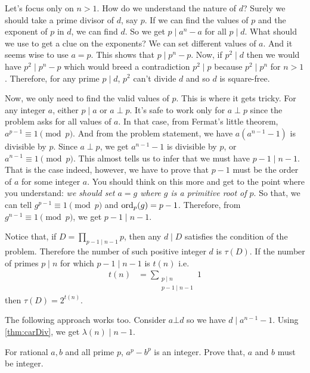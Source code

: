 \begin{solution}
	Let's focus only on $n>1$. How do we understand the nature of $d$? Surely we should take a prime divisor of $d$, say $p$. If we can find the values of $p$ and the exponent of $p$ in $d$, we can find $d$. So we get $p\mid a^n-a$ for all $p\mid d$. What should we use to get a clue on the exponents? We can set different values of $a$. And it seems wise to use $a=p$. This shows that $p\mid p^n-p$. Now, if $p^2\mid d$ then we would have $p^2\mid p^n-p$ which would breed a contradiction $p^2\mid p$ because $p^2\mid p^n$ for $n>1$. Therefore, for any prime $p\mid d$, $p^2$ can't divide $d$ and so $d$ is square-free.

	Now, we only need to find the valid values of $p$. This is where it gets tricky. For any integer $a$, either $p\mid a$ or $a\perp p$. It's safe to work only for $a\perp p$ since the problem asks for all values of $a$. In that case, from Fermat's little theorem, $a^{p-1}\equiv1\pmod p$. And from the problem statement, we have $a(a^{n-1}-1)$ is divisible by $p$. Since $a\perp p$, we get $a^{n-1}-1$ is divisible by $p$, or $a^{n-1}\equiv1\pmod p$. This almost tells us to infer that we must have $p-1\mid n-1$. That is the case indeed, however, we have to prove that $p-1$ must be the order of $a$ for some integer $a$. You should think on this more and get to the point where you understand: \textit{we should set $a=g$ where $g$ is a primitive root of $p$}. So that, we can tell $g^{p-1}\equiv1\pmod p$ and $\operatorname{ord}_p(g)=p-1$. Therefore, from $g^{n-1}\equiv1\pmod p$, we get $p-1\mid n-1$.

	Notice that, if $D=\prod\limits_{p-1\mid n-1}p$, then any $d\mid D$ satisfies the condition of the problem. Therefore the number of such positive integer $d$ is $\tau(D)$. If the number of primes $p\mid n$ for which $p-1\mid n-1$ is $t(n)$ i.e.
		\begin{align*}
			t(n) & = \sum\limits_{\substack{p\mid n\\p-1\mid n-1}}1
		\end{align*}
	then $\tau(D) = 2^{t(n)}$.
\end{solution}

\begin{note}
	The following approach works too. Consider $a\bot d$ so we have $d\mid a^{n-1}-1$. Using \autoref{thm:carDiv}, we get $\lambda(n)\mid n-1$.
\end{note}

\begin{problem}
	For rational $a,b$ and all prime $p$, $a^p-b^p$ is an integer. Prove that, $a$ and $b$ must be integer.
\end{problem}

